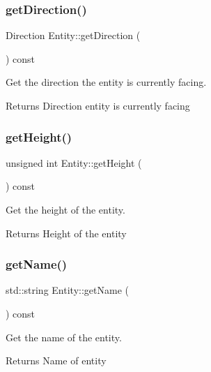\subsubsection{\texorpdfstring{get\+Direction()}{getDirection()}}
{\footnotesize\ttfamily Direction Entity\+::get\+Direction (\begin{DoxyParamCaption}{ }\end{DoxyParamCaption}) const}



Get the direction the entity is currently facing. 

\begin{DoxyReturn}{Returns}
Direction entity is currently facing 
\end{DoxyReturn}
\mbox{\label{classEntity_a5bbd1da83a9212d0de7e6d0dca659bf8}} 
\subsubsection{\texorpdfstring{get\+Height()}{getHeight()}}
{\footnotesize\ttfamily unsigned int Entity\+::get\+Height (\begin{DoxyParamCaption}{ }\end{DoxyParamCaption}) const}



Get the height of the entity. 

\begin{DoxyReturn}{Returns}
Height of the entity 
\end{DoxyReturn}
\mbox{\label{classEntity_a403f69eb888da7c5a690b79c658cdf47}} 
\subsubsection{\texorpdfstring{get\+Name()}{getName()}}
{\footnotesize\ttfamily std\+::string Entity\+::get\+Name (\begin{DoxyParamCaption}{ }\end{DoxyParamCaption}) const}



Get the name of the entity. 

\begin{DoxyReturn}{Returns}
Name of entity 
\end{DoxyReturn}
\mbox{\label{classEntity_a0db2ab8dd08e0da409133786803bd4e0}} 
